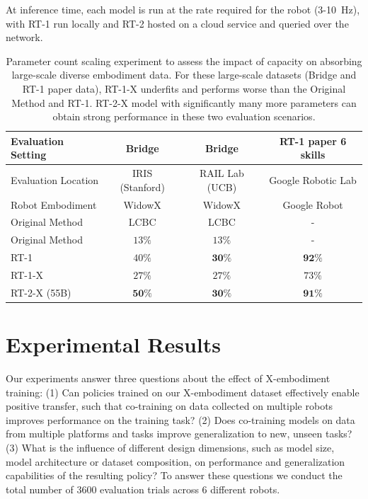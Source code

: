 \documentclass[letterpaper, 10 pt, conference]{ieeeconf}  %
\newcommand{\edrbot}{Google Robot\xspace}
\newcommand{\cro}{X}
\begin{document}
At inference time, each model is run at the rate required for the robot (3-10~Hz), with RT-1 run locally and RT-2 hosted on a cloud service and queried over the network. 


\begin{table}
\vspace{1em}
        \centering
        \scriptsize
        \setlength{\tabcolsep}{3pt}
        \begin{tabular}{@{}lccc@{}}
        \toprule
        Evaluation Setting & Bridge & Bridge & RT-1 paper 6 skills \\
        \midrule
        Evaluation Location & IRIS (Stanford) & RAIL Lab (UCB) & Google Robotic Lab \\
        Robot Embodiment &  WidowX & WidowX & \edrbot \\
        Original Method & LCBC \cite{walke2023bridgedata} & LCBC \cite{walke2023bridgedata} & - \\
        \midrule
        Original Method & $13\%$ & $13\%$ & - \\
        RT-1 & $40\%$ & $\textbf{30\%}$ & $\textbf{92\%}$ \\
        RT-1-X & $27\%$ & $27\%$ & $73\%$ \\  
        RT-2-X (55B) & $\textbf{50\%}$ & $\textbf{30\%}$ & $\textbf{91\%}$ \\
        \bottomrule
        \end{tabular}
        \vspace{-0.15em}
        \caption{ \small Parameter count scaling experiment to assess the impact of capacity on absorbing large-scale diverse embodiment data. For these large-scale datasets (Bridge and RT-1 paper data), RT-1-X underfits and performs  worse than the Original Method and RT-1. 
        RT-2-X model with significantly many more parameters can obtain strong performance in these two evaluation scenarios.}         
        \label{tab:result_on_dataset_with_more_than_5k_episodes}
        \vspace{-3em}
\end{table}

\vspace{-0.2em}
\section{Experimental Results}
\vspace{-0.1em}

Our experiments answer three questions about the effect of \cro-embodiment training:
(1) Can policies trained on our \cro-embodiment dataset effectively enable positive transfer, such that co-training on data collected on multiple robots improves performance on the training task? 
(2) Does co-training models on data from multiple platforms and tasks improve generalization to new, unseen tasks? 
(3) What is the influence of different design dimensions, such as model size, model architecture or dataset composition, on performance and generalization capabilities of the resulting policy?
To answer these questions we conduct the total number of 3600 evaluation trials across 6 different robots.
\end{document}
